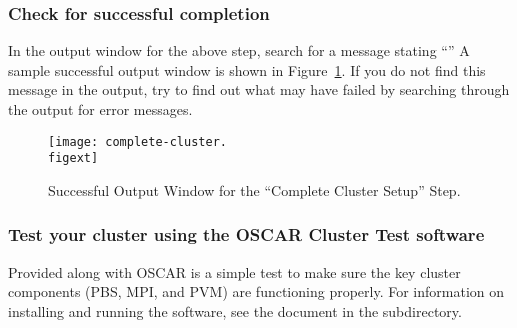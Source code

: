 \subsubsection{Check for successful completion}

In the output window for the above step, search for a message stating
``'' A
sample successful output window is shown in
Figure~\ref{fig:detailed-successful-cluster-setup}. If you do not find
this message in the output, try to find out what may have failed by
searching through the output for error messages.

  \begin{figure}[htbp]
    \begin{center}
      \texttt{[image: complete-cluster.\\figext]}
      \caption{Successful Output Window for the ``Complete
        Cluster Setup'' Step.}
      \label{fig:detailed-successful-cluster-setup}
    \end{center}
  \end{figure}


\subsubsection{Test your cluster using the OSCAR Cluster Test
  software}
            
Provided along with OSCAR is a simple test to make sure the key
cluster components (PBS, MPI, and PVM) are functioning properly. For
information on installing and running the software, see the
 document in the  subdirectory.

